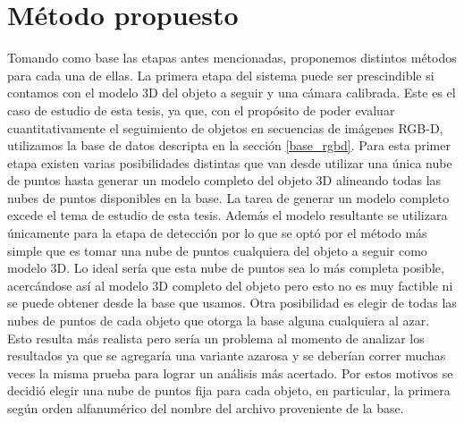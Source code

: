 \section{Método propuesto}\label{metodo_propuesto}
Tomando como base las etapas antes mencionadas, proponemos distintos métodos para cada una de ellas. La primera etapa del sistema puede ser prescindible si contamos con el modelo 3D del objeto a seguir y una cámara calibrada. Este es el caso de estudio de esta tesis, ya que, con el propósito de poder evaluar cuantitativamente el seguimiento de objetos en secuencias de imágenes RGB-D, utilizamos la base de datos descripta en la sección \ref{base_rgbd}.
Para esta primer etapa existen varias posibilidades distintas que van desde utilizar una única nube de puntos hasta generar un modelo completo del objeto 3D alineando todas las nubes de puntos disponibles en la base. La tarea de generar un modelo completo excede el tema de estudio de esta tesis. Además el modelo resultante se utilizara únicamente para la etapa de detección por lo que se optó por el método más simple que es tomar una nube de puntos cualquiera del objeto a seguir como modelo 3D. Lo ideal sería que esta nube de puntos sea lo más completa posible, acercándose así al modelo 3D completo del objeto pero esto no es muy factible ni se puede obtener desde la base que usamos. Otra posibilidad es elegir de todas las nubes de puntos de cada objeto que otorga la base alguna cualquiera al azar. Esto resulta más realista pero sería un problema al momento de analizar los resultados ya que se agregaría una variante azarosa y se deberían correr muchas veces la misma prueba para lograr un análisis más acertado. Por estos motivos se decidió elegir una nube de puntos fija para cada objeto, en particular, la primera según orden alfanumérico del nombre del archivo proveniente de la base.


